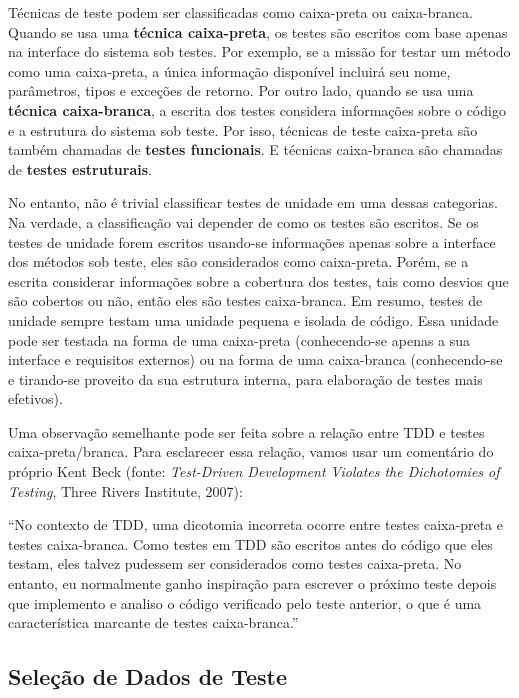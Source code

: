 \documentclass[
  11pt,
  twoside]{book}
\renewenvironment{quote}{\centering \vspace{1.5ex} \begin{tcolorbox}[colback=backcolor, width=4.9in]}{\end{tcolorbox}}
\begin{document}
Técnicas de teste podem ser classificadas como caixa-preta ou
caixa-branca. Quando se usa uma \textbf{técnica caixa-preta}, os testes
são escritos com base apenas na interface do sistema sob testes. Por
exemplo, se a missão for testar um método como uma caixa-preta, a única
informação disponível incluirá seu nome, parâmetros, tipos e exceções de
retorno. Por outro lado, quando se usa uma \textbf{técnica
caixa-branca}, a escrita dos testes considera informações sobre o código
e a estrutura do sistema sob teste. Por isso, técnicas de teste
caixa-preta são também chamadas de \textbf{testes funcionais}. E
técnicas caixa-branca são chamadas de \textbf{testes estruturais}.

No entanto, não é trivial classificar testes de unidade em uma dessas
categorias. Na verdade, a classificação vai depender de como os testes
são escritos. Se os testes de unidade forem escritos usando-se
informações apenas sobre a interface dos métodos sob teste, eles são
considerados como caixa-preta. Porém, se a escrita considerar
informações sobre a cobertura dos testes, tais como desvios que são
cobertos ou não, então eles são testes caixa-branca. Em resumo, testes
de unidade sempre testam uma unidade pequena e isolada de código. Essa
unidade pode ser testada na forma de uma caixa-preta (conhecendo-se
apenas a sua interface e requisitos externos) ou na forma de uma
caixa-branca (conhecendo-se e tirando-se proveito da sua estrutura
interna, para elaboração de testes mais efetivos).

 Uma observação semelhante pode ser feita sobre a
relação entre TDD e testes caixa-preta/branca. Para esclarecer essa
relação, vamos usar um comentário do próprio Kent Beck (fonte:
\emph{Test-Driven Development Violates the Dichotomies of Testing},
Three Rivers Institute, 2007):

\begin{quote}
``No contexto de TDD, uma dicotomia incorreta ocorre entre testes
caixa-preta e testes caixa-branca. Como testes em TDD são escritos antes
do código que eles testam, eles talvez pudessem ser considerados como
testes caixa-preta. No entanto, eu normalmente ganho inspiração para
escrever o próximo teste depois que implemento e analiso o código
verificado pelo teste anterior, o que é uma característica marcante de
testes caixa-branca.''
\end{quote}

\hypertarget{seleuxe7uxe3o-de-dados-de-teste}{%
\subsection{Seleção de Dados de
Teste}\label{seleuxe7uxe3o-de-dados-de-teste}}
\end{document}

